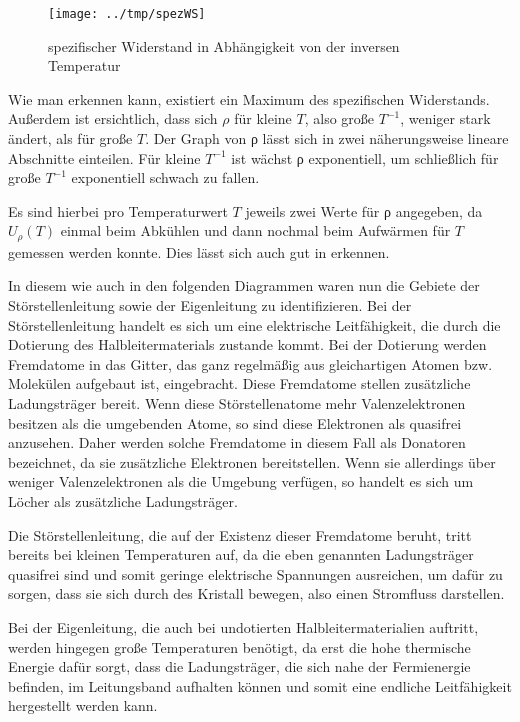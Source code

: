 \begin{figure}[htb]
   \centering
   \texttt{[image: ../tmp/spezWS]}
   \caption{spezifischer Widerstand in Abhängigkeit von der inversen Temperatur}
   \label{fig:spezWS}
\end{figure}

Wie man erkennen kann, existiert ein Maximum des spezifischen Widerstands.
Außerdem ist ersichtlich, dass sich $ρ$ für kleine $T$, also große $T^{-1}$,
weniger stark ändert, als für große $T$.
Der Graph von ρ lässt sich in zwei
näherungsweise lineare Abschnitte einteilen. Für kleine $T^{-1}$ ist wächst ρ
exponentiell, um schließlich für große $T^{-1}$ exponentiell schwach zu fallen.

Es sind hierbei pro Temperaturwert $T$ jeweils zwei Werte für ρ angegeben, da $U_ρ(T)$
einmal beim Abkühlen und dann nochmal beim Aufwärmen für $T$ gemessen werden konnte.
Dies lässt sich auch gut in  erkennen.

In diesem wie auch in den folgenden Diagrammen waren nun die Gebiete der
Störstellenleitung sowie der Eigenleitung zu identifizieren. Bei der
Störstellenleitung handelt es sich um eine elektrische Leitfähigkeit, die durch
die Dotierung des Halbleitermaterials zustande kommt. Bei der Dotierung werden
Fremdatome in das Gitter, das ganz regelmäßig aus gleichartigen Atomen bzw.
Molekülen aufgebaut ist, eingebracht. Diese Fremdatome stellen zusätzliche
Ladungsträger bereit. Wenn diese Störstellenatome mehr Valenzelektronen besitzen
als die umgebenden Atome, so sind diese Elektronen als quasifrei anzusehen.
Daher werden solche Fremdatome in diesem Fall als Donatoren bezeichnet, da sie
zusätzliche Elektronen bereitstellen. Wenn sie allerdings über weniger
Valenzelektronen als die Umgebung verfügen, so handelt es sich um Löcher als
zusätzliche Ladungsträger.

Die Störstellenleitung, die auf der Existenz dieser Fremdatome beruht, tritt
bereits bei kleinen Temperaturen auf, da die eben genannten Ladungsträger
quasifrei sind und somit geringe elektrische Spannungen ausreichen, um dafür zu
sorgen, dass sie sich durch des Kristall bewegen, also einen Stromfluss
darstellen.

Bei der Eigenleitung, die auch bei undotierten Halbleitermaterialien auftritt,
werden hingegen große Temperaturen benötigt, da erst die hohe thermische Energie
dafür sorgt, dass die Ladungsträger, die sich nahe der Fermienergie befinden, im
Leitungsband aufhalten können und somit eine endliche Leitfähigkeit hergestellt
werden kann. 

